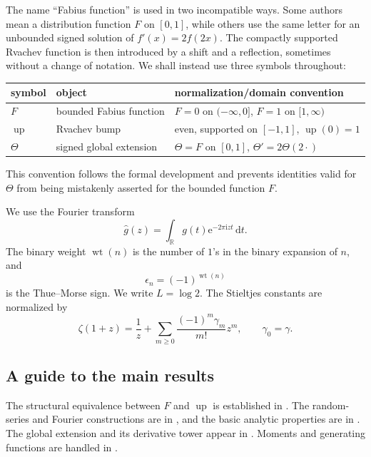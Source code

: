 \documentclass[11pt]{article}
\numberwithin{equation}{section}
\theoremstyle{definition}
\theoremstyle{remark}
\DeclareMathOperator{\wt}{wt}
\newcommand{\R}{\mathbb{R}}
\newcommand{\dd}{\,\mathrm{d}}
\newcommand{\e}{\mathrm{e}}
\newcommand{\ii}{\mathrm{i}}
\newcommand{\upf}{\operatorname{up}}
\newcommand{\Th}{\Theta}
\begin{document}
The name ``Fabius function'' is used in two incompatible ways.  Some authors
mean a distribution function $F$ on $[0,1]$, while others use the same letter
for an unbounded signed solution of $f'(x)=2f(2x)$.  The compactly supported
Rvachev function is then introduced by a shift and a reflection, sometimes
without a change of notation.  We shall instead use three symbols throughout:
\begin{center}
\begin{tabular}{@{}lll@{}}
\toprule
symbol & object & normalization/domain convention\\
\midrule
$F$ & bounded Fabius function & $F=0$ on $(-\infty,0]$, $F=1$ on $[1,\infty)$\\
$\upf$ & Rvachev bump & even, supported on $[-1,1]$, $\upf(0)=1$\\
$\Th$ & signed global extension & $\Th=F$ on $[0,1]$, $\Th'=2\Th(2\cdot)$\\
\bottomrule
\end{tabular}
\end{center}
This convention follows the formal development and prevents identities valid
for $\Th$ from being mistakenly asserted for the bounded function $F$.

We use the Fourier transform
\begin{equation}\label{eq:fourier-convention}
 \widehat g(z)=\int_{\R}g(t)\e^{-2\pi\ii zt}\dd t.
\end{equation}
The binary weight $\wt(n)$ is the number of $1$'s in the binary expansion of
$n$, and
\begin{equation}\label{eq:tm-sign}
 \epsilon_n=(-1)^{\wt(n)}
\end{equation}
is the Thue--Morse sign.  We write $L=\log2$.  The Stieltjes constants are
normalized by
\[
 \zeta(1+z)=\frac1z+\sum_{m\ge0}\frac{(-1)^m\gamma_m}{m!}z^m,
 \qquad \gamma_0=\gamma.
\]

\subsection{A guide to the main results}

The structural equivalence between $F$ and $\upf$ is established in
.  The random-series and Fourier constructions are
in , and the basic analytic properties are in
.  The global extension and its derivative tower
appear in .  Moments and generating functions are
handled in .
\end{document}
